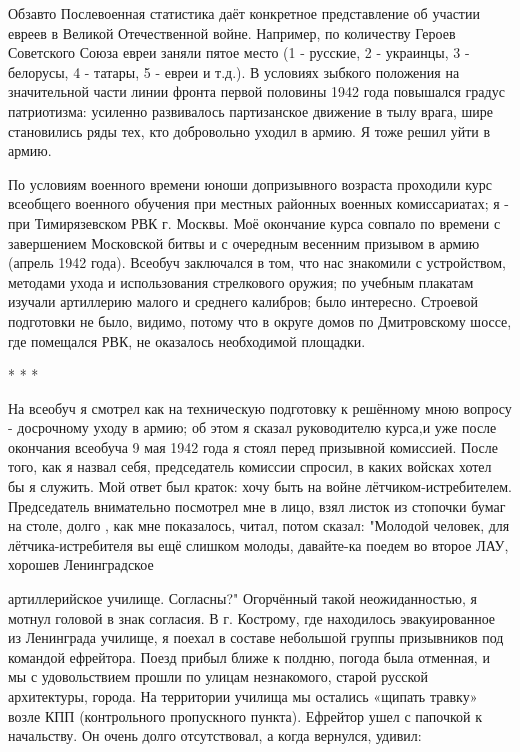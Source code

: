 \label{247-1}
Обзавто
Послевоенная статистика даёт конкретное представление об участии евреев в Великой Отечественной войне. Например, по количеству Героев Советского Союза евреи заняли пятое место (1 - русские, 2 - украинцы, 3 - белорусы, 4 - татары, 5 - евреи и т.д.). В условиях зыбкого положения на значительной части линии фронта первой половины 1942 года повышался градус патриотизма: усиленно развивалось партизанское движение в тылу врага, шире становились ряды тех, кто добровольно уходил в армию. Я тоже решил уйти в армию.

\label{248-1}
По условиям военного времени юноши допризывного возраста проходили курс всеобщего военного обучения при местных районных военных комиссариатах; я - при Тимирязевском РВК г. Москвы. Моё окончание курса совпало по времени с завершением Московской битвы и с очередным весенним призывом в армию (апрель 1942 года). Всеобуч заключался в том, что нас знакомили с устройством, методами ухода и использования стрелкового оружия; по учебным плакатам изучали артиллерию малого и среднего калибров; было интересно. Строевой подготовки не было, видимо, потому что в округе домов по Дмитровскому шоссе, где помещался РВК, не оказалось необходимой площадки.

* * *

\label{249-1}
На всеобуч я смотрел как на техническую подготовку к решённому мною вопросу - досрочному уходу в армию; об этом я сказал руководителю курса,и уже после окончания всеобуча 9 мая 1942 года я стоял перед призывной комиссией. После того, как я назвал себя, председатель комиссии спросил, в каких войсках хотел бы я служить. Мой ответ был краток: хочу быть на войне лётчиком-истребителем. Председатель внимательно посмотрел мне в лицо, взял листок из стопочки бумаг на столе, долго , как мне показалось, читал, потом сказал: "Молодой человек, для лётчика-истребителя вы ещё слишком молоды, давайте-ка поедем во второе ЛАУ, хорошев Ленинградское 

\label{250-1}
артиллерийское училище. Согласны?" Огорчённый такой неожиданностью, я мотнул головой в знак согласия. 
В г. Кострому, где находилось эвакуированное из Ленинграда училище, я поехал в составе небольшой группы призывников под командой ефрейтора. Поезд прибыл ближе к полдню, погода была отменная, и мы с удовольствием прошли по улицам незнакомого, старой русской архитектуры, города. На территории училища мы остались «щипать травку» возле КПП (контрольного пропускного пункта). Ефрейтор ушел с папочкой к начальству. Он очень долго отсутствовал, а когда вернулся, удивил:

